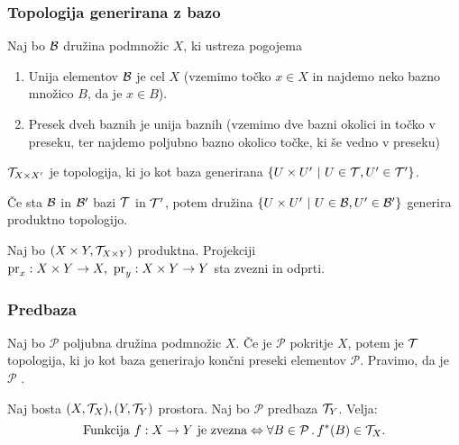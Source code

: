 \subsubsection{Topologija generirana z bazo}

\begin{trditev}
    Naj bo $\mathcal{B}$ družina podmnožic $X$, ki ustreza pogojema
    \begin{enumerate}
        \item Unija elementov $\mathcal{B}$ je cel $X$ (vzemimo točko $x \in X$ in najdemo neko bazno množico $B$, da je $x \in B$).
        \item Presek dveh baznih je unija baznih (vzemimo dve bazni okolici in točko v preseku, ter najdemo poljubno bazno okolico točke, ki še vedno v preseku)
    \end{enumerate} 
\end{trditev}
    
\begin{definicija}
     $\mathcal{T}_{X \times X'}$ je topologija, ki jo kot baza generirana $\left\{U \times U' \ | \ U \in \mathcal{T}, U' \in \mathcal{T}'\right\}$.
\end{definicija}

\begin{opomba}
    Če sta $\mathcal{B}$ in $\mathcal{B}'$ bazi $\mathcal{T}$ in $\mathcal{T}'$, potem družina $\left\{U \times U' \ | \ U \in \mathcal{B}, U' \in \mathcal{B}'\right\}$ generira produktno topologijo.
\end{opomba}

\begin{trditev}
    Naj bo $(X \times Y, \mathcal{T}_{X \times Y})$ produktna. Projekciji $\operatorname{pr}_x: X \times Y \to X, \ \operatorname{pr}_y: X \times Y \to Y$ sta zvezni in odprti.
\end{trditev}

\subsubsection{Predbaza}

\begin{trditev}
    Naj bo $\mathcal{P}$ poljubna družina podmnožic $X$. Če je $\mathcal{P}$ pokritje $X$, potem je $\mathcal{T}$ topologija, ki jo kot baza generirajo končni preseki elementov $\mathcal{P}$.
    Pravimo, da je $\mathcal{P}$ .
\end{trditev}

\begin{trditev}
    Naj bosta $(X, \mathcal{T}_X), (Y, \mathcal{T}_Y)$ prostora. Naj bo $\mathcal{P}$ predbaza $\mathcal{T}_Y$. Velja:
    $$\text{Funkcija } f: X \to Y \text{ je zvezna} \Leftrightarrow \forall B \in \mathcal{P} \,.\, f^{*}(B) \in \mathcal{T}_X.$$
\end{trditev}

